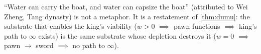 \begin{remark}
``Water can carry the boat, and water can capsize the boat'' (attributed
to Wei Zheng, Tang dynasty) is not a metaphor. It is a restatement of
\cref{thm:dumu}: the substrate that enables the king's viability
($w > 0$ $\implies$ pawn functions $\implies$ king's path to $\infty$
exists) is the same substrate whose depletion destroys it ($w = 0$
$\implies$ pawn $\to$ sword $\implies$ no path to $\infty$).
\end{remark}
